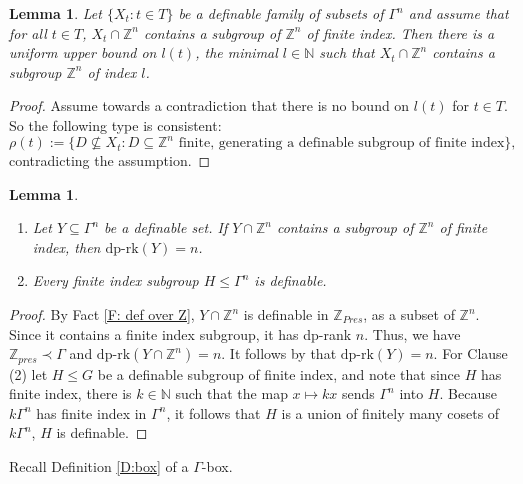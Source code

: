 \documentclass[11pt]{amsart}
\newtheorem{lemma}[theorem]{Lemma}
\theoremstyle{definition}
\newcommand{\Nn}{{\mathbb{N}}}
\newcommand{\Zz}{{\mathbb {Z}}}
\newcommand{\0}{\emptyset}
\def\dpr{\mathrm{dp\text{-}rk}}
\begin{document}
\begin{lemma}\label{L:bound on index}
    Let $\{X_t:t\in T\}$ be a definable family of subsets of $\Gamma^n$ and assume that for all $t\in T$, $X_t\cap \mathbb{Z}^n$ contains a subgroup of $\mathbb{Z}^n$ of finite index. Then there is a uniform upper bound on $l(t)$,  the minimal $l\in \Nn$ such that $X_t\cap \Zz^n$ contains a subgroup $\Zz^n$ of index $l$.  
\end{lemma}
\begin{proof}
    Assume towards a contradiction  that there is no bound on $l(t)$ for $t\in T$.  So the following type is consistent:
    \[\rho(t):=\{D\not\subseteq X_t: D\subseteq \mathbb{Z}^n \text{ finite, generating a definable subgroup of finite index}\},\] contradicting the assumption.
\end{proof}



\begin{lemma}\label{F: full dp-rank, presburger}
\begin{enumerate}
    \item Let $Y\subseteq \Gamma^n$ be a definable set. If $Y\cap \mathbb{Z}^n$ contains a subgroup of $\mathbb{Z}^n$ of finite index, then $\dpr(Y)=n$.
    \item Every finite index subgroup $H\leq \Gamma^n$ is definable. 
\end{enumerate}
\end{lemma}
\begin{proof}
By Fact \ref{F: def over Z}, $Y\cap \mathbb{Z}^n$ is definable in $\Zz_{Pres}$, as a subset of $\mathbb{Z}^n$. Since it contains a finite index subgroup, it has dp-rank $n$. Thus, we have $\mathbb Z_{pres}\prec \Gamma$ and $\dpr(Y\cap \mathbb Z^n)=n$.  It follows by \cite[Lemma 3.10]{HaHaPeVF} that $\dpr(Y)=n$. For Clause (2) let $H\le G$ be a definable subgroup of finite index, and note that since $H$ has finite index, there is $k\in \mathbb N$ such that the map $x\mapsto kx$ sends $\Gamma^n$ into $H$.  Because $k\Gamma^n$ has finite index in $\Gamma^n$,  it follows that $H$ is a union of finitely many cosets of $k\Gamma^n$, $H$ is  definable.
\end{proof}

Recall Definition \ref{D:box} of a $\Gamma$-box.
\end{document}
